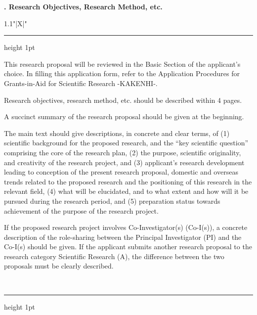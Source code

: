 \documentclass[8pt]{extarticle}
\makeatletter
\newcommand{\thickhline}{%
	\noalign {\ifnum 0=`}\fi \hrule height 1pt
	\futurelet \reserved@a \@xhline
}
\makeatother
\begin{document}
	
\noindent\textbf{\fontsize{12}{12}. Research Objectives, Research Method, etc.}\\
\begin{tabularx}{1.1\linewidth}{"|X|"}
	\thickhline
	This research proposal will be reviewed in the Basic Section of the applicant's choice. In filling this application form, refer to the Application Procedures for Grants-in-Aid for Scientific Research -KAKENHI-.
	
	Research objectives, research method, etc. should be described within 4 pages.
	
	A succinct summary of the research proposal should be given at the beginning.
	
	The main text should give descriptions, in concrete and clear terms, of (1) scientific background for the proposed research, and the ``key scientific question'' comprising the core of the research plan, (2) the purpose, scientific originality, and creativity of the research project, and (3) applicant's research development leading to conception of the present research proposal, domestic and overseas trends related to the proposed research and the positioning of this research in the relevant field, (4) what will be elucidated, and to what extent and how will it be pursued during the research period, and (5) preparation status towards achievement of the purpose of the research project. 
	
	If the proposed research project involves Co-Investigator(s) (Co-I(s)), a concrete description of the role-sharing between the Principal Investigator (PI) and the Co-I(s) should be given. If the applicant submits another research proposal to the research category Scientific Research (A), the difference between the two proposals must be clearly described.

	\\
	\thickhline
\end{tabularx}
\end{document}

